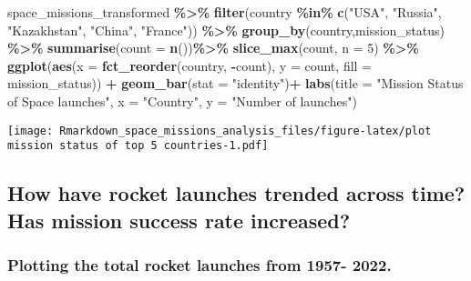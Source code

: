 \documentclass[
]{article}
\newenvironment{Shaded}{\begin{snugshade}}{\end{snugshade}}
\newcommand{\AttributeTok}[1]{\textcolor[rgb]{0.13,0.29,0.53}{#1}}
\newcommand{\DecValTok}[1]{\textcolor[rgb]{0.00,0.00,0.81}{#1}}
\newcommand{\FunctionTok}[1]{\textcolor[rgb]{0.13,0.29,0.53}{\textbf{#1}}}
\newcommand{\NormalTok}[1]{#1}
\newcommand{\SpecialCharTok}[1]{\textcolor[rgb]{0.81,0.36,0.00}{\textbf{#1}}}
\newcommand{\StringTok}[1]{\textcolor[rgb]{0.31,0.60,0.02}{#1}}
\begin{document}
\begin{Shaded}
\begin{Highlighting}[]
\NormalTok{space\_missions\_transformed }\SpecialCharTok{\%\textgreater{}\%}
  \FunctionTok{filter}\NormalTok{(country }\SpecialCharTok{\%in\%} \FunctionTok{c}\NormalTok{(}\StringTok{"USA"}\NormalTok{, }\StringTok{"Russia"}\NormalTok{, }\StringTok{"Kazakhstan"}\NormalTok{, }\StringTok{"China"}\NormalTok{, }\StringTok{"France"}\NormalTok{)) }\SpecialCharTok{\%\textgreater{}\%} 
  \FunctionTok{group\_by}\NormalTok{(country,mission\_status) }\SpecialCharTok{\%\textgreater{}\%}
  \FunctionTok{summarise}\NormalTok{(}\AttributeTok{count =} \FunctionTok{n}\NormalTok{())}\SpecialCharTok{\%\textgreater{}\%}
  \FunctionTok{slice\_max}\NormalTok{(count, }\AttributeTok{n =} \DecValTok{5}\NormalTok{) }\SpecialCharTok{\%\textgreater{}\%} 
  \FunctionTok{ggplot}\NormalTok{(}\FunctionTok{aes}\NormalTok{(}\AttributeTok{x =} \FunctionTok{fct\_reorder}\NormalTok{(country, }\SpecialCharTok{{-}}\NormalTok{count), }\AttributeTok{y =}\NormalTok{ count, }\AttributeTok{fill =}\NormalTok{ mission\_status)) }\SpecialCharTok{+}
  \FunctionTok{geom\_bar}\NormalTok{(}\AttributeTok{stat =} \StringTok{"identity"}\NormalTok{)}\SpecialCharTok{+}
  \FunctionTok{labs}\NormalTok{(}\AttributeTok{title =} \StringTok{"Mission Status of Space launches"}\NormalTok{,}
       \AttributeTok{x =} \StringTok{"Country"}\NormalTok{,}
       \AttributeTok{y =} \StringTok{"Number of launches"}\NormalTok{) }
\end{Highlighting}
\end{Shaded}

\texttt{[image: Rmarkdown\_space\_missions\_analysis\_files/figure-latex/plot mission status of top 5 countries-1.pdf]}

\hypertarget{how-have-rocket-launches-trended-across-time-has-mission-success-rate-increased}{%
\subsection{\texorpdfstring{\textbf{How have rocket launches trended
across time? Has mission success rate
increased?}}{How have rocket launches trended across time? Has mission success rate increased?}}\label{how-have-rocket-launches-trended-across-time-has-mission-success-rate-increased}}

\hypertarget{plotting-the-total-rocket-launches-from-1957--2022.}{%
\subsubsection{Plotting the total rocket launches from 1957-
2022.}\label{plotting-the-total-rocket-launches-from-1957--2022.}}
\end{document}
